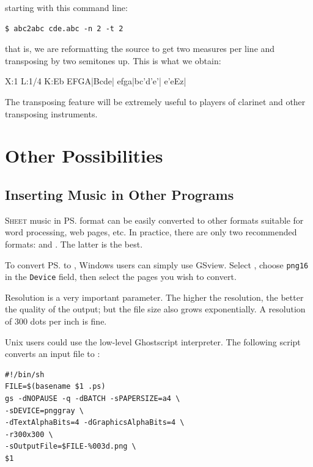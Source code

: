 \documentclass[a4paper,12pt]{book}
\begin{document}
starting  with this command line:

\begin{verbatim}
$ abc2abc cde.abc -n 2 -t 2
\end{verbatim}

that is, we are reformatting the source to get two measures per line
and transposing by two semitones up. This is what we obtain:

\begin{abcsource}
X:1
L:1/4
K:Eb
%
EFGA|Bcde|
efga|bc'd'e'|
e'eEz|
\end{abcsource}

The transposing feature will be extremely useful to players of
clarinet and other transposing instruments.


\noteseparator


\chapter{Other Possibilities}


\section{Inserting Music in Other Programs}
\label{sec:word}

\lettrine{S}{heet} music in \ps{} format can be easily converted to
other formats suitable for word processing, web pages, etc. In
practice, there are only two recommended formats:  and
. The latter is the best.

To convert \ps{} to , Windows users can simply use GSview.
Select , choose \texttt{png16} in the
\texttt{Device} field, then select the pages you wish to convert.

Resolution is a very important parameter. The higher the resolution,
the better the quality of the output; but the file size also grows
exponentially. A resolution of 300 dots per inch is fine.

Unix users could use the low-level Ghostscript interpreter. The
following script converts an input file to :

\begin{verbatim}
#!/bin/sh
FILE=$(basename $1 .ps)
gs -dNOPAUSE -q -dBATCH -sPAPERSIZE=a4 \
-sDEVICE=pnggray \
-dTextAlphaBits=4 -dGraphicsAlphaBits=4 \
-r300x300 \
-sOutputFile=$FILE-%003d.png \
$1
\end{verbatim}
\end{document}
